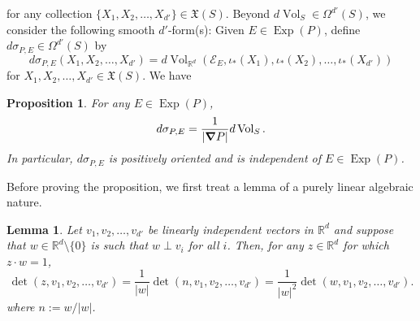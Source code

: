 \documentclass[11pt]{article}
\newtheorem{lemma}[theorem]{Lemma}
\newtheorem{proposition}[theorem]{Proposition}
\newcommand\Exp{\operatorname{Exp}}
\renewcommand\det{\operatorname{det}}
\newcommand{\Vol}{\operatorname{Vol}}
\begin{document}
for any collection $\{X_1,X_2,\dots,X_{d'}\}\in \mathfrak{X}(S)$. Beyond $d\Vol_S\in \Omega^{d'}(S)$, we consider the following smooth $d'$-form(s): Given $E\in \Exp(P)$, define $d\sigma_{P,E}\in\Omega^{d'}(S)$ by
\begin{equation*}
    d\sigma_{P,E}(X_1,X_2,\dots,X_{d'})=d\Vol_{\mathbb{R}^d}(\mathcal{E}_E,\iota_*(X_1),\iota_*(X_2),\dots,\iota_*(X_{d'}))
\end{equation*}
for $X_1,X_2,\dots,X_{d'}\in\mathfrak{X}(S)$. We have
\begin{proposition}\label{prop:FormRiemannRelation}
For any $E\in\Exp(P)$,
\begin{equation*}
    d\sigma_{P,E}=\frac{1}{|\grad P|}d\Vol_S.
\end{equation*}
In particular, $d\sigma_{P,E}$ is positively oriented and is independent of $E\in\Exp(P)$.
\end{proposition}
\noindent Before proving the proposition, we first treat a lemma of a purely linear algebraic nature. 
\begin{lemma}\label{lem:determinants}
Let $v_1,v_2,\dots,v_{d'}$ be linearly independent vectors in $\mathbb{R}^d$ and suppose that $w\in\mathbb{R}^d \setminus\{0\}$ is such that $w\perp v_i$ for all $i$. Then, for any $z\in\mathbb{R}^d$ for which $z\cdot w=1$,
\begin{equation*}
\det(z, v_1,v_2,\dots,v_{d'})=\frac{1}{|w|}\det(n,v_1,v_2,\dots,v_{d'})=\frac{1}{|w|^2}\det(w,v_1,v_2,\dots,v_{d'}).
\end{equation*}
where $n:=w/|w|$.
\end{lemma}
\end{document}
